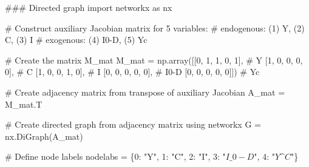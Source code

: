 \documentclass[
  letterpaper,
  DIV=11,
  numbers=noendperiod]{scrreprt}
\newenvironment{Shaded}{\begin{snugshade}}{\end{snugshade}}
\newcommand{\CommentTok}[1]{\textcolor[rgb]{0.37,0.37,0.37}{#1}}
\newcommand{\DecValTok}[1]{\textcolor[rgb]{0.68,0.00,0.00}{#1}}
\newcommand{\ImportTok}[1]{\textcolor[rgb]{0.00,0.46,0.62}{#1}}
\newcommand{\NormalTok}[1]{\textcolor[rgb]{0.00,0.23,0.31}{#1}}
\newcommand{\OperatorTok}[1]{\textcolor[rgb]{0.37,0.37,0.37}{#1}}
\newcommand{\StringTok}[1]{\textcolor[rgb]{0.13,0.47,0.30}{#1}}
\begin{document}
\begin{tcolorbox}[enhanced jigsaw, titlerule=0mm, breakable, bottomrule=.15mm, toprule=.15mm, colbacktitle=quarto-callout-note-color!10!white, rightrule=.15mm, toptitle=1mm, opacityback=0, left=2mm, coltitle=black, title=\textcolor{quarto-callout-note-color}{\faInfo}\hspace{0.5em}{Python code}, colframe=quarto-callout-note-color-frame, opacitybacktitle=0.6, leftrule=.75mm, bottomtitle=1mm, arc=.35mm, colback=white]

\begin{Shaded}
\begin{Highlighting}[]
\CommentTok{\#\#\# Directed graph}
\ImportTok{import}\NormalTok{ networkx }\ImportTok{as}\NormalTok{ nx}

\CommentTok{\# Construct auxiliary Jacobian matrix for 5 variables: }
\CommentTok{\# endogenous: (1) Y, (2) C, (3) I}
\CommentTok{\# exogenous: (4) I0{-}D, (5) Yc}

\CommentTok{\# Create the matrix M\_mat}
\NormalTok{M\_mat }\OperatorTok{=}\NormalTok{ np.array([[}\DecValTok{0}\NormalTok{, }\DecValTok{1}\NormalTok{, }\DecValTok{1}\NormalTok{, }\DecValTok{0}\NormalTok{, }\DecValTok{1}\NormalTok{],  }\CommentTok{\# Y}
\NormalTok{                  [}\DecValTok{1}\NormalTok{, }\DecValTok{0}\NormalTok{, }\DecValTok{0}\NormalTok{, }\DecValTok{0}\NormalTok{, }\DecValTok{0}\NormalTok{],  }\CommentTok{\# C}
\NormalTok{                  [}\DecValTok{1}\NormalTok{, }\DecValTok{0}\NormalTok{, }\DecValTok{0}\NormalTok{, }\DecValTok{1}\NormalTok{, }\DecValTok{0}\NormalTok{],  }\CommentTok{\# I}
\NormalTok{                  [}\DecValTok{0}\NormalTok{, }\DecValTok{0}\NormalTok{, }\DecValTok{0}\NormalTok{, }\DecValTok{0}\NormalTok{, }\DecValTok{0}\NormalTok{],  }\CommentTok{\# I0{-}D}
\NormalTok{                  [}\DecValTok{0}\NormalTok{, }\DecValTok{0}\NormalTok{, }\DecValTok{0}\NormalTok{, }\DecValTok{0}\NormalTok{, }\DecValTok{0}\NormalTok{]]) }\CommentTok{\# Yc}

\CommentTok{\# Create adjacency matrix from transpose of auxiliary Jacobian}
\NormalTok{A\_mat }\OperatorTok{=}\NormalTok{ M\_mat.T}

\CommentTok{\# Create directed graph from adjacency matrix using networkx}
\NormalTok{G }\OperatorTok{=}\NormalTok{ nx.DiGraph(A\_mat)}

\CommentTok{\# Define node labels}
\NormalTok{nodelabs }\OperatorTok{=}\NormalTok{ \{}\DecValTok{0}\NormalTok{: }\StringTok{"Y"}\NormalTok{, }\DecValTok{1}\NormalTok{: }\StringTok{"C"}\NormalTok{, }\DecValTok{2}\NormalTok{: }\StringTok{"I"}\NormalTok{, }\DecValTok{3}\NormalTok{: }\StringTok{"$I\_0 {-} D$"}\NormalTok{, }\DecValTok{4}\NormalTok{: }\StringTok{"$Y\^{}C$"}\NormalTok{\}}


\end{Highlighting}
\end{Shaded}
\end{tcolorbox}
\end{document}
